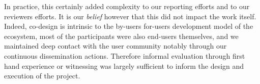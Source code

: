 In practice, this certainly added complexity to our reporting efforts
and to our reviewers efforts. It is our \emph{belief} however that
this did not impact the work itself. Indeed, co-design is intrinsic to
the by-users for-users development model of the ecosystem, most of the
participants were also end-users themselves, and we maintained deep
contact with the user community notably through our continuous
dissemination actions. Therefore informal evaluation through first
hand experience or witnessing was largely sufficient to inform the
design and execution of the project.




